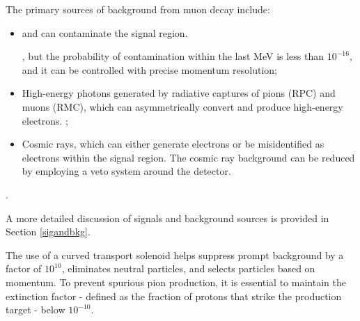 The primary sources of background from muon decay include: 
\begin{itemize} 
  \item {}


    and can contaminate the signal region. 

    , but the probability of 
  contamination within the last MeV is less than $10^{-16}$, 
  and it can be controlled with precise momentum resolution; 
  \item High-energy photons generated by radiative captures of pions (RPC) 
  and muons (RMC), which can asymmetrically convert and produce high-energy 
  electrons. ;

  \item Cosmic rays, which can either generate electrons or be misidentified as 
  electrons within the signal region. The cosmic ray background can be reduced 
  by employing a veto system around the detector. 
\end{itemize}

.


A more detailed discussion of signals and background sources is provided in Section \ref{sigandbkg}.

The use of a curved transport solenoid helps  suppress 
prompt background by a factor of $10^{10}$, eliminates 
neutral particles, and selects particles based on momentum. 
To prevent spurious pion production, it is essential to maintain the 
extinction factor - defined as the fraction of protons that strike the 
production target  - below $10^{-10}$.

